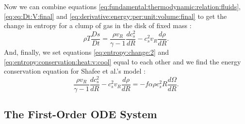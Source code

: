 \documentclass[]{article}
\newcommand{\dR}[1]{\frac{d #1}{dR}}
\newcommand{\Dt}[1]{\frac{D #1}{Dt}}
\begin{document}
Now we can combine equations
\eqref{eq:fundamental:thermodynamic:relation:fluids},
\eqref{eq:eq:Dt:V:final} and
\eqref{eq:derivative:energy:per:unit:volume:final} to get the change
in entropy for a clump of gas in the disk of fixed mass
\cite{Shafee08,Narayan97}:
\begin{equation}
  \label{eq:entropy:conservation:heat:v:cool}
  \rho T \Dt{s} = \frac{\rho v_R}{\gamma - 1} \dR{c_s^2} - c_s^2 v_R \dR{\rho}.
\end{equation}
And, finally, we set equations \eqref{eq:entropy:change:2} and
\eqref{eq:entropy:conservation:heat:v:cool} equal to each other and we
find the energy conservation equation for Shafee et al.'s model \cite{Shafee08}:
\begin{equation}
  \label{eq:energy:conservation:final}
  \frac{\rho v_R}{\gamma - 1}\dR{c_s^2} - c_s^2 v_R \dR{\rho} = - f \alpha \rho c_s^2 R \dR{\Omega}.
\end{equation}

\subsection{The First-Order ODE System}
\label{subsec:first:order:ODE:system}
\end{document}
